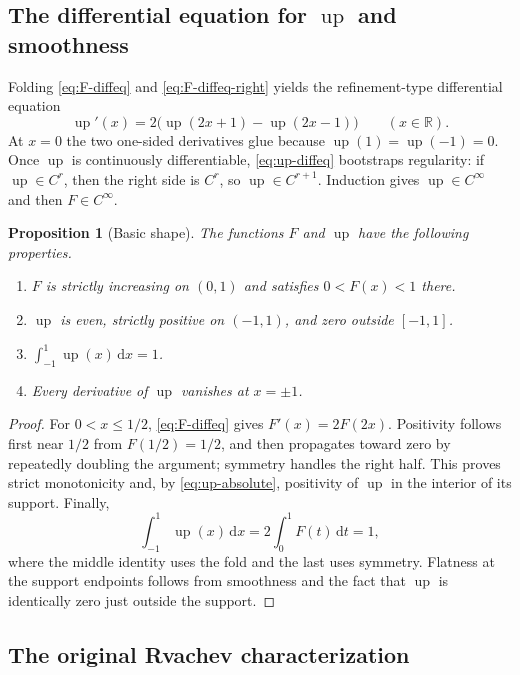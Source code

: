 \documentclass[11pt,oneside]{article}
\newtheorem{proposition}[theorem]{Proposition}
\theoremstyle{definition}
\theoremstyle{remark}
\newcommand{\R}{\mathbb R}
\newcommand{\Up}{\operatorname{up}}
\newcommand{\dd}{\,\mathrm d}
\begin{document}
\subsection{The differential equation for $\Up$ and smoothness}

Folding \eqref{eq:F-diffeq} and \eqref{eq:F-diffeq-right} yields the refinement-type
differential equation
\begin{equation}
 \Up'(x)=2\bigl(\Up(2x+1)-\Up(2x-1)\bigr)\qquad(x\in\R).  \label{eq:up-diffeq}
\end{equation}
At $x=0$ the two one-sided derivatives glue because $\Up(1)=\Up(-1)=0$.  Once $\Up$ is
continuously differentiable, \eqref{eq:up-diffeq} bootstraps regularity: if $\Up\in C^r$,
then the right side is $C^r$, so $\Up\in C^{r+1}$.  Induction gives $\Up\in C^\infty$ and
then $F\in C^\infty$.

\begin{proposition}[Basic shape]
The functions $F$ and $\Up$ have the following properties.
\begin{enumerate}
\item $F$ is strictly increasing on $(0,1)$ and satisfies $0<F(x)<1$ there.
\item $\Up$ is even, strictly positive on $(-1,1)$, and zero outside $[-1,1]$.
\item $\int_{-1}^{1}\Up(x)\dd x=1$.
\item Every derivative of $\Up$ vanishes at $x=\pm1$.
\end{enumerate}
\end{proposition}

\begin{proof}
For $0<x\le1/2$, \eqref{eq:F-diffeq} gives $F'(x)=2F(2x)$.  Positivity follows first near
$1/2$ from $F(1/2)=1/2$, and then propagates toward zero by repeatedly doubling the
argument; symmetry handles the right half.  This proves strict monotonicity and, by
\eqref{eq:up-absolute}, positivity of $\Up$ in the interior of its support.  Finally,
\begin{equation*}
 \int_{-1}^{1}\Up(x)\dd x
 =2\int_0^1F(t)\dd t=1,
\end{equation*}
where the middle identity uses the fold and the last uses symmetry.  Flatness at the support
endpoints follows from smoothness and the fact that $\Up$ is identically zero just outside
the support.
\end{proof}

\subsection{The original Rvachev characterization}
\end{document}
